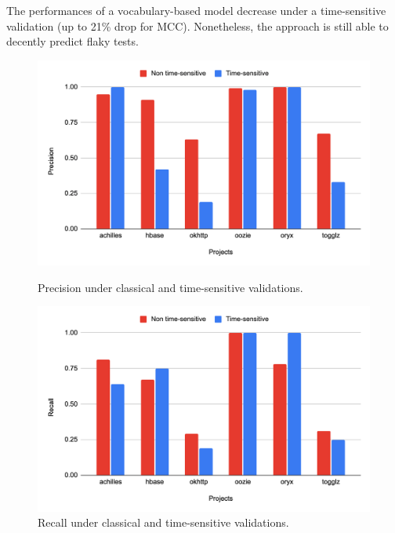 \begin{tcolorbox}
The performances of a vocabulary-based model decrease under a time-sensitive validation (up to 21\% drop for MCC).
Nonetheless, the approach is still able to decently predict flaky tests.
\end{tcolorbox}

\begin{figure}
  \centering
  \begin{minipage}[b]{0.4\textwidth}
    \includegraphics[width=\textwidth]{figures/replication/RQ1JavaPrecision.png}
    \caption{Precision under classical and time-sensitive validations.}
    \label{fig:prec-java}
  \end{minipage}
  \hfill
  \begin{minipage}[b]{0.4\textwidth}
    \includegraphics[width=\textwidth]{figures/replication/RQ1JavaRecall.png}
    \caption{Recall under classical and time-sensitive validations.}
    \label{fig:recall-java}
  \end{minipage}

\end{figure}
